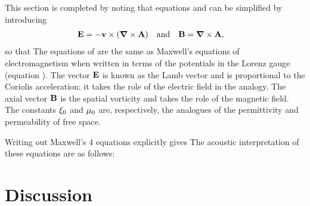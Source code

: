 This section is completed by noting that equations  and  can be simplified by introducing
\begin{align}
  \mathbf{E} &= - \textbf{v} \times \left(  \mbox{\boldmath $\nabla$} \times \textbf{A} \right) &\text{and}&&
  \mathbf{B} &= \mbox{\boldmath $\nabla$} \times \textbf{A},
\end{align}
so that
The equations of  are the same as  Maxwell's equations of electromagnetism when written in terms of the potentials in the Lorenz gauge\cite{Doran2003}
(equation ).
The vector $\mathbf{E}$ is known as the Lamb vector and is proportional to the Coriolis acceleration;
 it takes the role of the electric field in the analogy.
The axial vector $\mathbf{B}$ is the spatial vorticity and takes the role of the magnetic field.
The constants $\xi_0$ and $\mu_0$ are, respectively, the analogues of the permittivity and permeability of free space.

Writing out Maxwell's 4 equations explicitly gives
The acoustic interpretation of these equations are as follows:



\section{Discussion}\label{sec:discussion}

